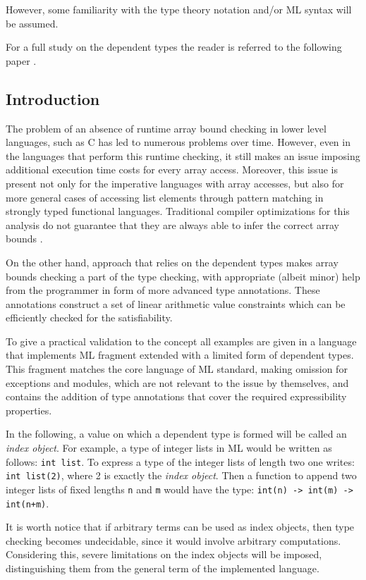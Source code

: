 \documentclass[a4paper,UKenglish]{lipics-v2016}
\begin{document}
However, some familiarity with the type theory notation and/or ML syntax
will be assumed.

For a full study on the dependent types the reader is referred to the following
paper \cite{Hofmann97syntaxand}.

\subsection{Introduction}
The problem of an absence of runtime array bound checking in lower level
languages, such as C has led to numerous problems over time. However, even in
the languages that perform this runtime checking, it still makes an issue
imposing additional execution time costs for every array access.  Moreover,
this issue is present not only for the imperative languages with array
accesses, but also for more general cases of accessing list elements through
pattern matching in strongly typed functional languages. Traditional compiler
optimizations for this analysis do not guarantee that they are always able to
infer the correct array bounds \cite{Gupta:1993}\cite{Suzuki:1977}.

On the other hand, approach that relies on the dependent types makes array
bounds checking a part of the type checking, with appropriate (albeit minor)
help from the programmer in form of more advanced type annotations. These
annotations construct a set of linear arithmetic value constraints which can be
efficiently checked for the satisfiability.

To give a practical validation to the  concept all examples are given in a
language that implements ML fragment extended with a limited form of dependent
types. This fragment matches the core language of ML standard, making omission
for exceptions and modules, which are not relevant to the issue by themselves,
and contains the addition of type annotations that cover the required
expressibility properties.

In the following, a value on which a dependent type is formed will be called an
\emph{index object}. For example, a type of integer lists in ML would be
written as follows: \texttt{int list}. To express a type of the integer lists
of length two one writes: \texttt{int list(2)}, where 2 is exactly the
\emph{index object}.  Then a function to append two integer lists of fixed
lengths \texttt{n} and \texttt{m} would have the type: \texttt{int(n) -> int(m)
-> int(n+m)}.

It is worth notice that if arbitrary terms can be used as index objects, then
type checking becomes undecidable, since it would involve arbitrary
computations.  Considering this, severe limitations on the index objects will
be imposed, distinguishing them from the general term of the implemented
language.
\end{document}
